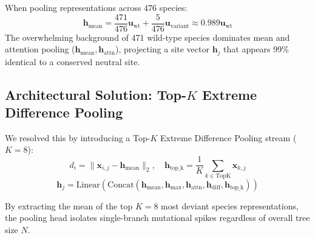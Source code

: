 \documentclass[11pt,a4paper]{article}
\begin{document}
When pooling representations across 476 species:
\begin{equation}
\mathbf{h}_{\text{mean}} = \frac{471}{476} \mathbf{u}_{\text{wt}} + \frac{5}{476} \mathbf{u}_{\text{variant}} \approx 0.989 \mathbf{u}_{\text{wt}}
\end{equation}
The overwhelming background of 471 wild-type species dominates mean and attention pooling ($\mathbf{h}_{\text{mean}}, \mathbf{h}_{\text{attn}}$), projecting a site vector $\mathbf{h}_j$ that appears 99\% identical to a conserved neutral site.

\subsection{Architectural Solution: Top-$K$ Extreme Difference Pooling}
We resolved this by introducing a Top-$K$ Extreme Difference Pooling stream ($K = 8$):
\begin{equation}
d_i = \|\mathbf{x}_{i,j} - \mathbf{h}_{\text{mean}}\|_2, \quad \mathbf{h}_{\text{top\_k}} = \frac{1}{K} \sum_{k \in \text{TopK}} \mathbf{x}_{k,j}
\end{equation}
\begin{equation}
\mathbf{h}_j = \text{Linear}\left(\text{Concat}\left(\mathbf{h}_{\text{mean}}, \mathbf{h}_{\text{max}}, \mathbf{h}_{\text{attn}}, \mathbf{h}_{\text{diff}}, \mathbf{h}_{\text{top\_k}}\right)\right)
\end{equation}

By extracting the mean of the top $K=8$ most deviant species representations, the pooling head isolates single-branch mutational spikes regardless of overall tree size $N$.
\end{document}
